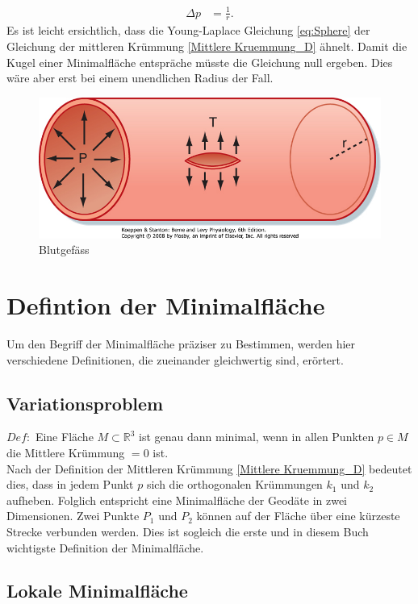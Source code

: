 \begin{refsection}
\begin{equation}
\begin{split}
\Delta p &=\frac{1}{r}.
\end{split}
\end{equation}
Es ist leicht ersichtlich, dass die Young-Laplace Gleichung \ref{eq:Sphere} der Gleichung der mittleren Krümmung \ref{Mittlere Kruemmung_D} ähnelt. Damit die Kugel einer Minimalfläche entspräche müsste die Gleichung null ergeben. Dies wäre aber erst bei einem unendlichen Radius der Fall. 
\begin{figure}
  \centering
  \includegraphics[scale=0.3]{minimal/BlutAder.jpg}
  \caption{Blutgefäss} 
  \label{fig:BlutAder}
\end{figure}

\section{Defintion der Minimalfläche}
Um den Begriff der Minimalfläche präziser zu Bestimmen, werden hier verschiedene Definitionen, die zueinander gleichwertig sind, erörtert.

\subsection{Variationsproblem}\label{Variationsproblem}
$Def:$ Eine Fläche $ \textit{M} \subset \mathbb{R}^{3} $ ist genau dann minimal, wenn in allen Punkten $p \in M$ die Mittlere Krümmung $=0$ ist.\\
Nach der Definition der Mittleren Krümmung \eqref{Mittlere Kruemmung_D} bedeutet dies, dass in jedem Punkt $p$ sich die orthogonalen Krümmungen $k_1$ und $k_2$ aufheben.
Folglich entspricht eine Minimalfläche der Geodäte in zwei Dimensionen. Zwei Punkte $P_1$ und $P_2$ können auf der Fläche über eine kürzeste Strecke verbunden werden.  Dies ist sogleich die erste und in diesem Buch wichtigste Definition der Minimalfläche.

\subsection{Lokale Minimalfläche}\label{Lokale Minimalflaeche}


\end{refsection}
